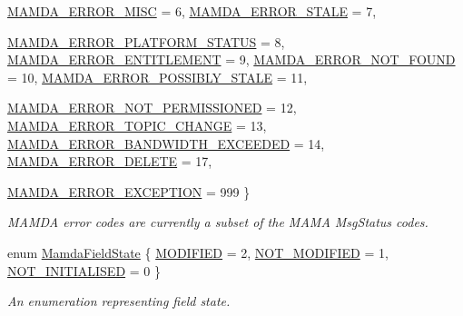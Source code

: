 \begin{CompactItemize}
\hyperlink{namespaceWombat_0bef5aac9df8b606704a54a376f4559706b6c14285230d93c79a92fb95543cb5}{MAMDA\_\-ERROR\_\-MISC} =  6, 
\hyperlink{namespaceWombat_0bef5aac9df8b606704a54a376f45597451b4ce93120e4ee9b7f1f53077c5189}{MAMDA\_\-ERROR\_\-STALE} =  7, 
\par
\hyperlink{namespaceWombat_0bef5aac9df8b606704a54a376f4559730e0711e51de923c4092aaeb620f65b1}{MAMDA\_\-ERROR\_\-PLATFORM\_\-STATUS} =  8, 
\hyperlink{namespaceWombat_0bef5aac9df8b606704a54a376f455977ffe36f901ce611e88452399e02a4cda}{MAMDA\_\-ERROR\_\-ENTITLEMENT} =  9, 
\hyperlink{namespaceWombat_0bef5aac9df8b606704a54a376f455977a693b3672cfc3222a7c4aac1a420e3f}{MAMDA\_\-ERROR\_\-NOT\_\-FOUND} =  10, 
\hyperlink{namespaceWombat_0bef5aac9df8b606704a54a376f455977c691b3b6987eb3523201cc9c9a80984}{MAMDA\_\-ERROR\_\-POSSIBLY\_\-STALE} =  11, 
\par
\hyperlink{namespaceWombat_0bef5aac9df8b606704a54a376f455977da639de44df2456b5176dae26d6a20e}{MAMDA\_\-ERROR\_\-NOT\_\-PERMISSIONED} =  12, 
\hyperlink{namespaceWombat_0bef5aac9df8b606704a54a376f45597234e5356b9a6486e5b8f207b8788ad6c}{MAMDA\_\-ERROR\_\-TOPIC\_\-CHANGE} =  13, 
\hyperlink{namespaceWombat_0bef5aac9df8b606704a54a376f455978f244609c8fa60f919fee9b6905ce18b}{MAMDA\_\-ERROR\_\-BANDWIDTH\_\-EXCEEDED} =  14, 
\hyperlink{namespaceWombat_0bef5aac9df8b606704a54a376f45597ec7ac661eff6544dbd1645a4457b0112}{MAMDA\_\-ERROR\_\-DELETE} =  17, 
\par
\hyperlink{namespaceWombat_0bef5aac9df8b606704a54a376f45597e017c060a50cfa552e9397ec9b73e051}{MAMDA\_\-ERROR\_\-EXCEPTION} =  999
 \}
\begin{CompactList}\small\item\em MAMDA error codes are currently a subset of the MAMA Msg\-Status codes. \item\end{CompactList}\item 
enum \hyperlink{namespaceWombat_93aac974f2ab713554fd12a1fa3b7d2a}{Mamda\-Field\-State} \{ \hyperlink{namespaceWombat_93aac974f2ab713554fd12a1fa3b7d2a2634ac8c664df2d1b704f7b0d21e969c}{MODIFIED} =  2, 
\hyperlink{namespaceWombat_93aac974f2ab713554fd12a1fa3b7d2a8775d4c624aaeb2c93a188bbd3f67abc}{NOT\_\-MODIFIED} =  1, 
\hyperlink{namespaceWombat_93aac974f2ab713554fd12a1fa3b7d2a407ab2e280bdda05b51b8972a52a46a7}{NOT\_\-INITIALISED} =  0
 \}
\begin{CompactList}\small\item\em An enumeration representing field state. \item\end{CompactList}\item 

\end{CompactItemize}
